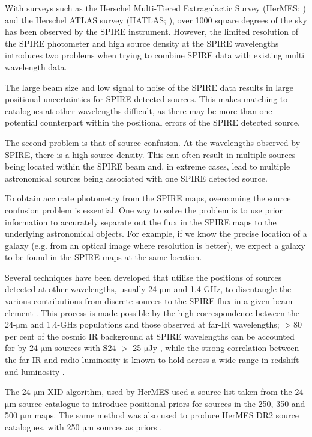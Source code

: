 \documentclass[useAMS,usenatbib]{mn2e}
\begin{document}
With surveys such as the Herschel Multi-Tiered Extragalactic Survey (HerMES; \cite{Oliver:2012}) and the Herschel ATLAS survey (HATLAS; \cite{}), over 1000 square degrees of the sky has been observed by the SPIRE instrument. However, the limited resolution of the SPIRE photometer and high source density at the SPIRE wavelengths introduces two problems when trying to combine SPIRE data with existing multi wavelength data. 

The large beam size and low signal to noise of the SPIRE data results in large positional uncertainties for SPIRE detected sources. This makes matching to catalogues at other wavelengths difficult, as there may be more than one potential counterpart within the positional errors of the SPIRE detected source.

The second problem is that of source confusion. At the wavelengths observed by SPIRE, there is a high source density. This can often result in multiple sources being located within the SPIRE beam and, in extreme cases, lead to multiple astronomical sources being associated with one SPIRE detected source. 

To obtain accurate photometry from the SPIRE maps, overcoming the source confusion problem is essential. One way to solve the problem is to use prior information to accurately separate out the flux in the SPIRE maps to the underlying astronomical objects. For example, if we know the precise location of a galaxy (e.g. from an optical image where resolution is better), we expect a galaxy to be found in the SPIRE maps at the same location.

Several techniques have been developed that utilise the positions of sources detected at other wavelengths, usually 24 $\mathrm{\mu m}$ and 1.4 GHz, to disentangle the various contributions from discrete sources to the SPIRE flux in a given beam element \citep[e.g.][]{Roseboom:2010, Roseboom:2011, Chapin:2011}. This process is made possible by the high correspondence between the 24-$\mathrm{\mu m}$ and 1.4-GHz populations and those observed at far-IR wavelengths; $>$80 per cent of the cosmic IR background at SPIRE wavelengths can be accounted for by 24-$\mathrm{\mu m}$ sources with S24 $>$ 25 $\mathrm{\mu Jy}$ \citep{Marsden:2009, Pascale:2009}, while the strong correlation between the far-IR and radio luminosity is known to hold across a wide range in redshift and luminosity \citep[e.g.][]{Ivison:2010}.

The 24 $\mathrm{\mu m}$ XID algorithm, used by HerMES \citep{Roseboom:2010, Roseboom:2011} used a source list taken from the 24-$\mathrm{\mu m}$ source catalogue to introduce positional priors for sources in the 250, 350 and 500 $\mathrm{\mu m}$ maps. The same method was also used to produce HerMES DR2 source catalogues, with 250 $\mathrm{\mu m}$ sources as priors \citep[DESPHOT]{Wang:2014}. 
\end{document}
